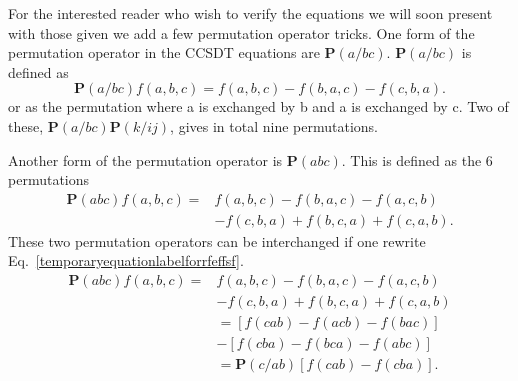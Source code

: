\documentclass[graybox,sectrefs,envcountresetchap,open=right]{svmonodo}
\begin{document}
For the interested reader who wish to verify the equations we will
soon present with those given we add a few permutation operator
tricks. One form of the permutation operator in the CCSDT equations
are $\mathbf{P}(a/bc)$. $\mathbf{P}(a/bc)$ is defined as 
\begin{equation} \mathbf{P}(a/bc) f(a,b,c) = f(a,b,c) - f(b,a,c) -
f(c,b,a) .  
\end{equation} 
or as the permutation where a is
exchanged by b and a is exchanged by c. Two of these,
$\mathbf{P}(a/bc) \mathbf{P}(k/ij)$, gives in total nine
permutations. 

Another form of the permutation operator is $\mathbf{P}(abc)$. This is defined as the 6 permutations
\begin{align}
\mathbf{P}(abc) f(a,b,c) = & f(a,b,c) - f(b,a,c) - f(a,c,b)  \nonumber \\ & - f(c,b,a) + f(b,c,a) + f(c,a,b) . \label{temporaryequation\labelforrfeffsf}
\end{align}
These two permutation operators can be interchanged if one rewrite Eq.~\ref{temporaryequationlabelforrfeffsf}. 
\begin{align}
\mathbf{P}(abc) f(a,b,c) = & f(a,b,c) - f(b,a,c) - f(a,c,b)  \nonumber \\ & - f(c,b,a) + f(b,c,a) + f(c,a,b) \nonumber \\ &
= \left[ f(cab) - f(acb) - f(bac) \right] \nonumber \\ &
- \left[ f(cba) - f(bca) - f(abc) \right]
\nonumber \\ &
= \mathbf{P}(c/ab) \left[ f(cab) - f(cba) \right] .
\end{align}
\end{document}
